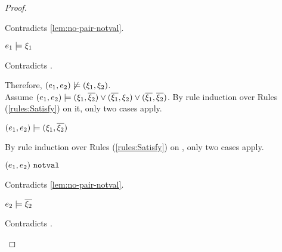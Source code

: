 \begin{proof}
\begin{byCases}
\begin{byCases}
\begin{byCases}
\begin{byCases}
                Contradicts \autoref{lem:no-pair-notval}.
            \item[\text{(\ref{rule:CSPair})}]
                \begin{pfsteps*}
                \item $e_1 \models \xi_1$ 
                \end{pfsteps*}
                Contradicts .
            \end{byCases}
            Therefore, $(e_1 , e_2) \not\models (\xi_1 , \xi_2)$. \\
            Assume $(e_1 , e_2) \models (\xi_1 , \overline{\xi_2}) \vee (\overline{\xi_1} , \xi_2) \vee (\overline{\xi_1} , \overline{\xi_2})$. By rule induction over Rules (\ref{rules:Satisfy}) on it, only two cases apply.
            \begin{byCases}
            \item[\text{(\ref{rule:CSOr1})}]
                \begin{pfsteps*}
                \item $(e_1 , e_2) \models (\xi_1 , \overline{\xi_2})$  
                \end{pfsteps*}
                By rule induction over Rules (\ref{rules:Satisfy}) on , only two cases apply.
                \begin{byCases}
                \item[\text{(\ref{rule:CSNotValPair})}]
                    \begin{pfsteps*}
                    \item $(e_1 , e_2) ~\mathtt{notval}$ 
                    \end{pfsteps*}
                    Contradicts \autoref{lem:no-pair-notval}.
                \item[\text{(\ref{rule:CSPair})}]
                    \begin{pfsteps*}
                    \item $e_2 \models \overline{\xi_2}$ 
                    \end{pfsteps*}
                    Contradicts .
                \end{byCases}

\end{byCases}
\end{byCases}
\end{byCases}
\end{byCases}
\end{proof}
